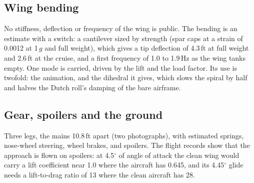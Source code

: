 \documentclass[10pt,a4paper,twocolumn]{article}
\begin{document}
\subsection{Wing bending}
No stiffness, deflection or frequency of the wing is public. The bending is an estimate with a switch: a cantilever sized by strength (spar caps at a
strain of 0.0012 at 1\,$g$ and full weight), which gives a tip deflection of 4.3\,ft at full weight and 2.6\,ft at the cruise, and a first
frequency of 1.0 to 1.9\,Hz as the wing tanks empty. One mode is carried, driven by the lift and the load factor. Its use is twofold: the animation, and
the dihedral it gives, which slows the spiral by half and halves the Dutch roll's damping of the bare airframe.

\subsection{Gear, spoilers and the ground}
Three legs, the mains 10.8\,ft apart (two photographs), with estimated springs, nose-wheel steering, wheel brakes, and spoilers. The flight records show that the approach is flown on spoilers: at
4.5$^\circ$ of angle of attack the clean wing would carry a lift coefficient near 1.0 where the aircraft has 0.645, and its 4.45$^\circ$ glide needs a
lift-to-drag ratio of 13 where the clean aircraft has 28.
\end{document}
